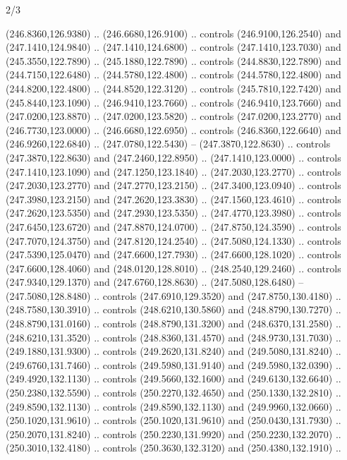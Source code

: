 \begin{flagdescription}{2/3}
\begin{scope}[xshift=0.5\flaglength,yshift=0.5\flagwidth,scale=\flagwidth/259.2]
\begin{scope}[y=0.8pt, x=0.8pt, yscale=-1,shift={(-243,-162)}]
      (246.8360,126.9380) .. (246.6680,126.9100) .. controls (246.9100,126.2540) and
      (247.1410,124.9840) .. (247.1410,124.6800) .. controls (247.1410,123.7030) and
      (245.3550,122.7890) .. (245.1880,122.7890) .. controls (244.8830,122.7890) and
      (244.7150,122.6480) .. (244.5780,122.4800) .. controls (244.5780,122.4800) and
      (244.8200,122.4800) .. (244.8520,122.3120) .. controls (245.7810,122.7420) and
      (245.8440,123.1090) .. (246.9410,123.7660) .. controls (246.9410,123.7660) and
      (247.0200,123.8870) .. (247.0200,123.5820) .. controls (247.0200,123.2770) and
      (246.7730,123.0000) .. (246.6680,122.6950) .. controls (246.8360,122.6640) and
      (246.9260,122.6840) .. (247.0780,122.5430) -- (247.3870,122.8630) .. controls
      (247.3870,122.8630) and (247.2460,122.8950) .. (247.1410,123.0000) .. controls
      (247.1410,123.1090) and (247.1250,123.1840) .. (247.2030,123.2770) .. controls
      (247.2030,123.2770) and (247.2770,123.2150) .. (247.3400,123.0940) .. controls
      (247.3980,123.2150) and (247.2620,123.3830) .. (247.1560,123.4610) .. controls
      (247.2620,123.5350) and (247.2930,123.5350) .. (247.4770,123.3980) .. controls
      (247.6450,123.6720) and (247.8870,124.0700) .. (247.8750,124.3590) .. controls
      (247.7070,124.3750) and (247.8120,124.2540) .. (247.5080,124.1330) .. controls
      (247.5390,125.0470) and (247.6600,127.7930) .. (247.6600,128.1020) .. controls
      (247.6600,128.4060) and (248.0120,128.8010) .. (248.2540,129.2460) .. controls
      (247.9340,129.1370) and (247.6760,128.8630) .. (247.5080,128.6480) --
      (247.5080,128.8480) .. controls (247.6910,129.3520) and (247.8750,130.4180) ..
      (248.7580,130.3910) .. controls (248.6210,130.5860) and (248.8790,130.7270) ..
      (248.8790,131.0160) .. controls (248.8790,131.3200) and (248.6370,131.2580) ..
      (248.6210,131.3520) .. controls (248.8360,131.4570) and (248.9730,131.7030) ..
      (249.1880,131.9300) .. controls (249.2620,131.8240) and (249.5080,131.8240) ..
      (249.6760,131.7460) .. controls (249.5980,131.9140) and (249.5980,132.0390) ..
      (249.4920,132.1130) .. controls (249.5660,132.1600) and (249.6130,132.6640) ..
      (250.2380,132.5590) .. controls (250.2270,132.4650) and (250.1330,132.2810) ..
      (249.8590,132.1130) .. controls (249.8590,132.1130) and (249.9960,132.0660) ..
      (250.1020,131.9610) .. controls (250.1020,131.9610) and (250.0430,131.7930) ..
      (250.2070,131.8240) .. controls (250.2230,131.9920) and (250.2230,132.2070) ..
      (250.3010,132.4180) .. controls (250.3630,132.3120) and (250.4380,132.1910) ..

\end{scope}
\end{scope}
\end{flagdescription}
